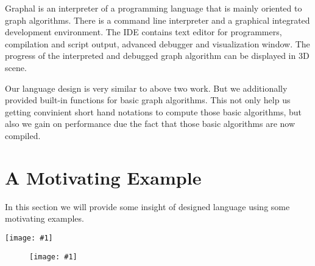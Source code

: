 \documentclass[letterpaper]{sig-alternate} \special{papersize=8.5in,11in}
\newcommand{\fig}[1]{\texttt{[image: \#1]}}
\begin{document}
Graphal is an interpreter of a programming language that is mainly oriented to
graph algorithms. There is a command line interpreter and a graphical
integrated development environment. The IDE contains text editor for
programmers, compilation and script output, advanced debugger and visualization
window. The progress of the interpreted and debugged graph algorithm can be
displayed in 3D scene.

Our language design is very similar to above two work. But we additionally provided
built-in functions for basic graph algorithms. This not only help us getting
convinient short hand notations to compute those basic algorithms, but also we gain on 
performance due the fact that those basic algorithms are now compiled.



\section{A Motivating Example}\label{sec:motiv}
In this section we will provide some insight of designed language
using some motivating examples.

\begin{figure*}
\begin{center}
\fig{Figs/1}
\end{center}
\end{figure*}

\begin{figure}
\begin{center}
\fig{Figs/2}
\end{center}
\end{figure}
\end{document}
